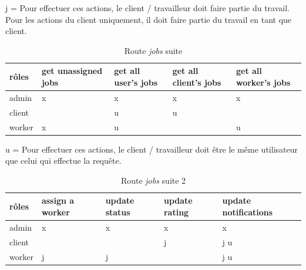 \documentclass[
    iai, %
    il, %
]{heig-tb}
\begin{document}
j = Pour effectuer ces actions, le client / travailleur doit faire partie du travail. \\
Pour les actions du client uniquement, il doit faire partie du travail en tant que client.


\begin{table}[h]
    \begin{center}
        \caption{Route \emph{jobs} suite \label{autorisations-route-jobs-other-get}}
        \begin{tabularx}{1.0\textwidth} {X|X|X|X|X}
            rôles  & get unassigned jobs & get all user's jobs & get all client's jobs & get all worker's jobs \\ \hline
            admin  & x                   & x                   & x                     & x                     \\
            client &                     & u                   & u                     &                       \\
            worker & x                   & u                   &                       & u                     \\
        \end{tabularx}
    \end{center}
\end{table}

u = Pour effectuer ces actions, le client / travailleur doit être le même utilisateur que celui qui effectue la requête.

\begin{table}[h]
    \begin{center}
        \caption{Route \emph{jobs} suite 2\label{autorisations-route-jobs-updates}}
        \begin{tabularx}{1.0\textwidth} {X|X|X|X|X}
            rôles  & assign a worker & update status & update rating & update notifications \\ \hline
            admin  & x               & x             & x             & x                    \\
            client &                 &               & j             & j u                  \\
            worker & j               & j             &               & j u                  \\
        \end{tabularx}
    \end{center}
\end{table}
\end{document}
